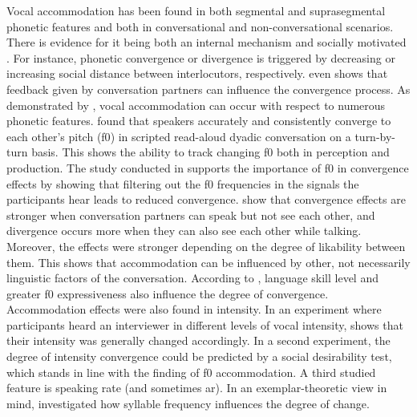Vocal accommodation has been found in both segmental \citep{Pardo2010conversational, Smith2007prosodic} and suprasegmental \citep{Walker2015repeat, Shockley2004imitation} phonetic features and
both in conversational \citep{Pardo2006phonetic, Lewandowski2012talent, Weise2018looking} and non-conversational \citep{Babel2014novelty, Shockley2004imitation} scenarios.
There is evidence for it being both an internal mechanism \citep{Pickering2004behavioral} and socially motivated \citep{Kim2011phonetic, Giles1991CAT, Babel2010dialect}.
For instance, phonetic convergence \citep{Giles1973mobility} or divergence \citep{Bourhis1977distinctiveness} is triggered by decreasing or increasing social distance between interlocutors, respectively.
 even shows that feedback given by conversation partners can influence the convergence process.
As demonstrated by \citet{Pardo2013measuring}, vocal accommodation can occur with respect to numerous phonetic features.
\citet{Aubanel2020speaking} found that speakers accurately and consistently converge to each other's pitch (\ac{f0}) in scripted read-aloud dyadic conversation on a turn-by-turn basis.
This shows the ability to track changing \ac{f0} both in perception and production.
The study conducted in \citet{Babel2012role} supports the importance of \ac{f0} in convergence effects by showing that filtering out the \ac{f0} frequencies in the signals the participants hear leads to reduced convergence.
\citet{Schweitzer2017visibility} show that convergence effects are stronger when conversation partners can speak but not see each other, and divergence occurs more when they can also see each other while talking.
Moreover, the effects were stronger depending on the degree of likability between them.
This shows that accommodation can be influenced by other, not necessarily linguistic factors of the conversation.
According to \citet{Lehnert2020relationship}, language skill level and greater \ac{f0} expressiveness also influence the degree of convergence.
Accommodation effects were also found in intensity.
In an experiment where participants heard an interviewer in different levels of vocal intensity, \citet{Natale1975convergence} shows that their intensity was generally changed accordingly.
In a second experiment, the degree of intensity convergence could be predicted by a social desirability test, which stands in line with the finding of \ac{f0} accommodation.
A third studied feature is speaking rate (and sometimes \acf{ar}).
In an exemplar-theoretic view in mind, \citet{Schweitzer2016exemplar} investigated how syllable frequency influences the degree of change.
